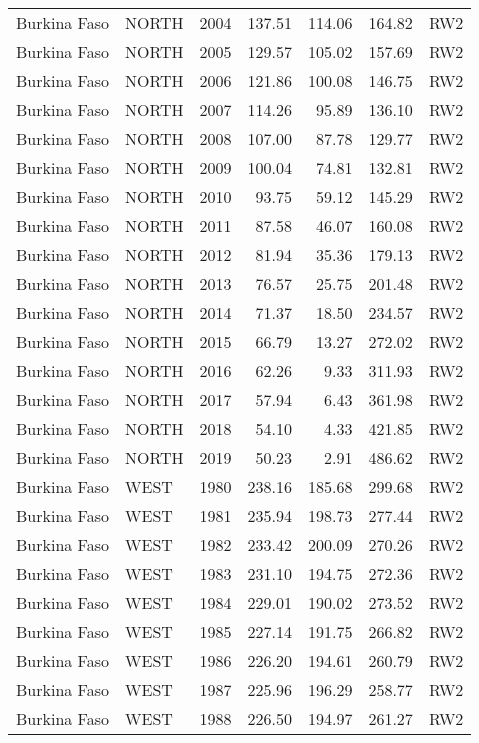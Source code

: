 \begin{longtable}{lllrrrl}
  Burkina Faso & NORTH & 2004 & 137.51 & 114.06 & 164.82 & RW2 \\ 
  Burkina Faso & NORTH & 2005 & 129.57 & 105.02 & 157.69 & RW2 \\ 
  Burkina Faso & NORTH & 2006 & 121.86 & 100.08 & 146.75 & RW2 \\ 
  Burkina Faso & NORTH & 2007 & 114.26 & 95.89 & 136.10 & RW2 \\ 
  Burkina Faso & NORTH & 2008 & 107.00 & 87.78 & 129.77 & RW2 \\ 
  Burkina Faso & NORTH & 2009 & 100.04 & 74.81 & 132.81 & RW2 \\ 
  Burkina Faso & NORTH & 2010 & 93.75 & 59.12 & 145.29 & RW2 \\ 
  Burkina Faso & NORTH & 2011 & 87.58 & 46.07 & 160.08 & RW2 \\ 
  Burkina Faso & NORTH & 2012 & 81.94 & 35.36 & 179.13 & RW2 \\ 
  Burkina Faso & NORTH & 2013 & 76.57 & 25.75 & 201.48 & RW2 \\ 
  Burkina Faso & NORTH & 2014 & 71.37 & 18.50 & 234.57 & RW2 \\ 
  Burkina Faso & NORTH & 2015 & 66.79 & 13.27 & 272.02 & RW2 \\ 
  Burkina Faso & NORTH & 2016 & 62.26 & 9.33 & 311.93 & RW2 \\ 
  Burkina Faso & NORTH & 2017 & 57.94 & 6.43 & 361.98 & RW2 \\ 
  Burkina Faso & NORTH & 2018 & 54.10 & 4.33 & 421.85 & RW2 \\ 
  Burkina Faso & NORTH & 2019 & 50.23 & 2.91 & 486.62 & RW2 \\ 
  Burkina Faso & WEST & 1980 & 238.16 & 185.68 & 299.68 & RW2 \\ 
  Burkina Faso & WEST & 1981 & 235.94 & 198.73 & 277.44 & RW2 \\ 
  Burkina Faso & WEST & 1982 & 233.42 & 200.09 & 270.26 & RW2 \\ 
  Burkina Faso & WEST & 1983 & 231.10 & 194.75 & 272.36 & RW2 \\ 
  Burkina Faso & WEST & 1984 & 229.01 & 190.02 & 273.52 & RW2 \\ 
  Burkina Faso & WEST & 1985 & 227.14 & 191.75 & 266.82 & RW2 \\ 
  Burkina Faso & WEST & 1986 & 226.20 & 194.61 & 260.79 & RW2 \\ 
  Burkina Faso & WEST & 1987 & 225.96 & 196.29 & 258.77 & RW2 \\ 
  Burkina Faso & WEST & 1988 & 226.50 & 194.97 & 261.27 & RW2 \\ 

\end{longtable}
